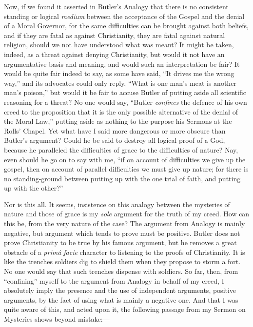 Now, if we found it asserted in Butler's Analogy that there is no
consistent standing or logical \emph{medium} between the acceptance of
the Gospel and the denial of a Moral Governor, for the same
difficulties can be brought against both beliefs, and if they are
fatal as against Christianity, they are fatal against natural
religion, should we not have understood what was meant? It might be
taken, indeed, as a threat against denying Christianity, but would it
not have an argumentative basis and meaning, and would such an
interpretation be fair? It would be quite fair indeed to say, as some
have said, ``It drives me the wrong way,'' and its advocates
could only reply, ``What is one man's meat is another man's
poison,'' but would it be fair to accuse Butler of putting aside
all scientific reasoning for a threat? No one would say, ``Butler \emph{confines}
the defence of his own creed to the proposition that it is the only
possible alternative of the denial of the Moral Law,'' putting
aside as nothing to the purpose his Sermons at the Rolls' Chapel. Yet
what have I said more dangerous or more obscure than Butler's
argument? Could he be said to destroy all logical proof of a God,
because he paralleled the difficulties of grace to the difficulties of
nature? Nay, even should he go on to say with me, ``if on account
of difficulties we give up the gospel, then on account of parallel
difficulties we must give up nature; for there is no standing-ground
between putting up with the one trial of faith, and putting up with
the other?''


Nor is this all. It seems, insistence on this analogy between the
mysteries of nature and those of grace is my \emph{sole} argument for
the truth of my creed. How can this be, from the very nature of the
case? The argument from Analogy is mainly negative, but argument which
tends to prove must be positive. Butler does not prove Christianity to
be true by his famous argument, but he removes a great obstacle of a \emph{primâ
facie} character to listening to the proofs of Christianity. It is
like the trenches soldiers dig to shield them when they propose to
storm a fort. No one would say that such trenches dispense with
soldiers. So far, then, from ``confining'' myself to the
argument from Analogy in behalf of my creed, I absolutely imply the
presence and the use of independent arguments, positive arguments, by
the fact of using what is mainly a negative one. And that I was quite
aware of this, and acted upon it, the following passage from my Sermon
on Mysteries shows beyond mistake:—


